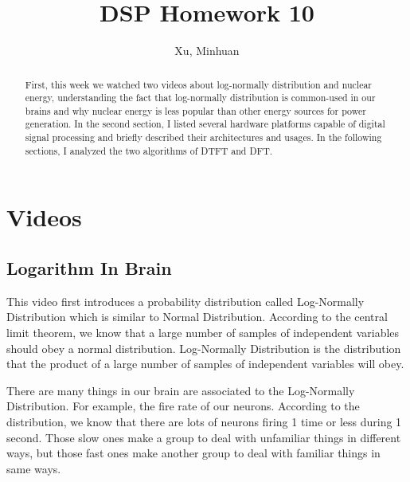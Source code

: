 \documentclass{article}
\begin{document}
\title{DSP Homework 10}
\author{Xu, Minhuan}
\maketitle
\tableofcontents
\begin{abstract}
First, this week we watched two videos about log-normally distribution and nuclear energy, understanding the fact that log-normally distribution is common-used in our brains and why nuclear energy is less popular than other energy sources for power generation. In the second section, I listed several hardware platforms capable of digital signal processing and briefly described their architectures and usages. In the following sections, I analyzed the two algorithms of DTFT and DFT.
\end{abstract}

\section{Videos}
\subsection{Logarithm In Brain}
This video first introduces a probability distribution called Log-Normally Distribution which is similar to Normal Distribution. According to the central limit theorem, we know that a large number of samples of independent variables should obey a normal distribution. Log-Normally Distribution is the distribution that the product of a large number of samples of independent variables will obey.

There are many things in our brain are associated to the Log-Normally Distribution. For example, the fire rate of our neurons. According to the distribution, we know that there are lots of neurons firing 1 time or less during 1 second. Those slow ones make a group to deal with unfamiliar things in different ways, but those fast ones make another group to deal with familiar things in same ways.
\end{document}

